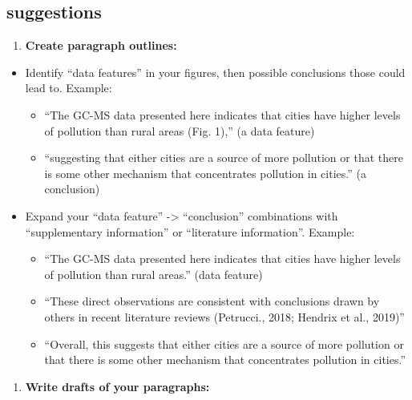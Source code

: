 \documentclass[
]{krantz}
\providecommand{\tightlist}{%
  \setlength{\itemsep}{0pt}\setlength{\parskip}{0pt}}
\begin{document}
\hypertarget{suggestions}{%
\subsection{suggestions}\label{suggestions}}

\begin{enumerate}
\def\labelenumi{\arabic{enumi}.}
\tightlist
\item
  \textbf{Create paragraph outlines:}
\end{enumerate}

\begin{itemize}
\tightlist
\item
  Identify ``data features'' in your figures, then possible conclusions those could lead to. Example:

  \begin{itemize}
  \tightlist
  \item
    ``The GC-MS data presented here indicates that cities have higher levels of pollution than rural areas (Fig. 1),'' (a data feature)
  \item
    ``suggesting that either cities are a source of more pollution or that there is some other mechanism that concentrates pollution in cities.'' (a conclusion)
  \end{itemize}
\item
  Expand your ``data feature'' -\textgreater{} ``conclusion'' combinations with ``supplementary information'' or ``literature information''. Example:

  \begin{itemize}
  \tightlist
  \item
    ``The GC-MS data presented here indicates that cities have higher levels of pollution than rural areas.'' (data feature)
  \item
    ``These direct observations are consistent with conclusions drawn by others in recent literature reviews (Petrucci., 2018; Hendrix et al., 2019)''
  \item
    ``Overall, this suggests that either cities are a source of more pollution or that there is some other mechanism that concentrates pollution in cities.''
  \end{itemize}
\end{itemize}

\begin{enumerate}
\def\labelenumi{\arabic{enumi}.}
\setcounter{enumi}{1}
\tightlist
\item
  \textbf{Write drafts of your paragraphs:}
\end{enumerate}
\end{document}
